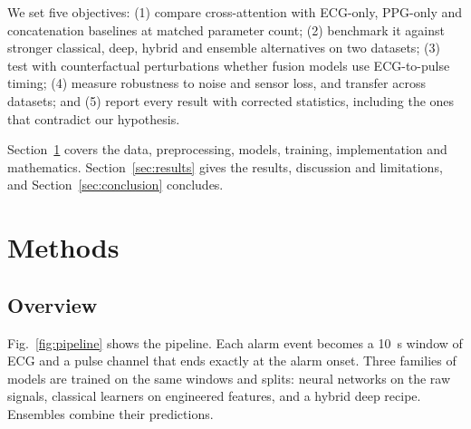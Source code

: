 \documentclass[conference]{IEEEtran}
\begin{document}
We set five objectives: (1) compare cross-attention with ECG-only, PPG-only and concatenation baselines at matched parameter count; (2) benchmark it against stronger classical, deep, hybrid and ensemble alternatives on two datasets; (3) test with counterfactual perturbations whether fusion models use ECG-to-pulse timing; (4) measure robustness to noise and sensor loss, and transfer across datasets; and (5) report every result with corrected statistics, including the ones that contradict our hypothesis.

Section~\ref{sec:methods} covers the data, preprocessing, models, training, implementation and mathematics. Section~\ref{sec:results} gives the results, discussion and limitations, and Section~\ref{sec:conclusion} concludes.

\section{Methods}\label{sec:methods}

\subsection{Overview}
Fig.~\ref{fig:pipeline} shows the pipeline. Each alarm event becomes a 10~s window of ECG and a pulse channel that ends exactly at the alarm onset. Three families of models are trained on the same windows and splits: neural networks on the raw signals, classical learners on engineered features, and a hybrid deep recipe. Ensembles combine their predictions.
\end{document}
